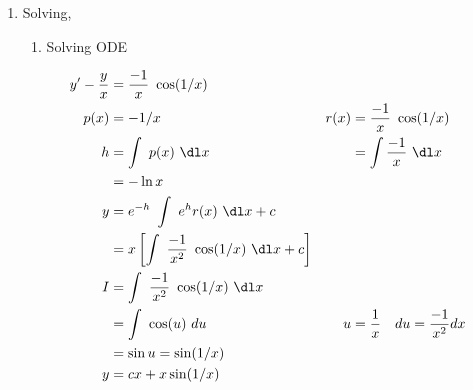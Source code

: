 \begin{enumerate}
          \begin{figure}[H]
              \centering
          \end{figure}

    \item Solving,
          \begin{enumerate}
              \item Solving ODE

                    \begin{align}
                        y' - \frac{y}{x} & = \frac{-1}{x}\ \cos(1/x)              \\
                        p(x)             & = -1/x                               &
                        r(x)             & = \frac{-1}{x}\ \cos(1/x)              \\
                        h                & = \int\ p(x)\ \dl x                  &
                                         & = \int \frac{-1}{x}\ \dl x             \\
                                         & = -\ln x                               \\
                        y                & = e^{-h}\ \int\ e^{h}r(x)\ \dl x + c   \\
                                         & = x \left[ \int\ \frac{-1}{x^{2}}
                        \ \cos(1/x)\ \dl x + c \right]                            \\
                        I                & =\int\ \frac{-1}{x^{2}}\ \cos(1/x)
                        \ \dl x                                                   \\
                                         & =\int\ \cos(u)\ du                   &
                        u                & = \frac{1}{x}\quad du
                        = \frac{-1}{x^{2}}dx                                      \\
                                         & = \sin u = \sin(1/x)                   \\
                        y                & = cx + x\sin(1/x)
                    \end{align}


\end{enumerate}
\end{enumerate}
